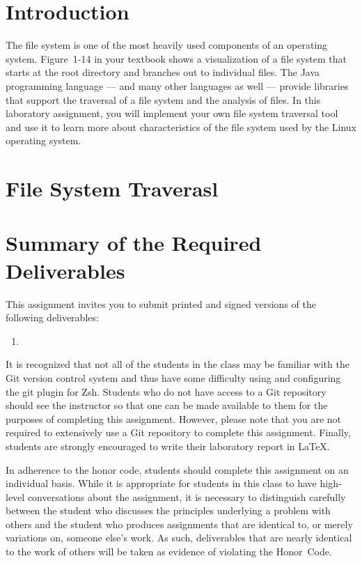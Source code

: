 

\usepackage[compact]{titlesec}



\section*{Introduction}
  
The file system is one of the most heavily used components of an operating system.  Figure~1-14 in your textbook shows a
visualization of a file system that starts at the root directory and branches out to individual files.  The Java programming
language --- and many other languages as well --- provide libraries that support the traversal of a file system and the analysis
of files. In this laboratory assignment, you will implement your own file system traversal tool and use it to learn more about
characteristics of the file system used by the Linux operating system.

\section*{File System Traverasl}

\section*{Summary of the Required Deliverables}

  This assignment invites you to submit printed and signed versions of the following deliverables: 

  \begin{enumerate}
    \item 
  \end{enumerate}

  It is recognized that not all of the students in the class may be familiar with the Git version control system and thus have some
  difficulty using and configuring the git plugin for Zsh.  Students who do not have access to a Git repository should see the
  instructor so that one can be made available to them for the purposes of completing this assignment. However, please note that you
  are not required to extensively use a Git repository to complete this assignment. Finally, students are strongly encouraged to
  write their laboratory report in \LaTeX.

  In adherence to the honor code, students should complete this assignment on an individual basis. While it is appropriate for
  students in this class to have high-level conversations about the assignment, it is necessary to distinguish carefully between the
  student who discusses the principles underlying a problem with others and the student who produces assignments that are identical
  to, or merely variations on, someone else's work.  As such, deliverables that are nearly identical to the work of others will be
  taken as evidence of violating the \mbox{Honor Code}.  



  
